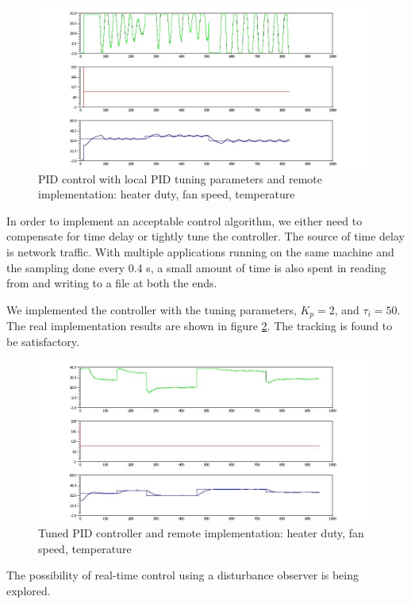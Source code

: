 \begin{figure}
\hspace{-0.2in}
\includegraphics[width=1.2\linewidth]{figures/pidc_intra_osc}
\caption{PID control with local PID tuning parameters and remote
  implementation: heater duty, fan speed, temperature}
\label{fig:pidosc}
\end{figure}

In order to implement an acceptable control algorithm, we either need to compensate for time delay or tightly tune the controller.  The source of time delay is network traffic.  With multiple applications running on the same machine and the sampling done every 0.4 s, a small amount of time is also spent in reading from and writing to a file at both the ends.

We implemented the controller with the tuning parameters, $K_p = 2$, and $\tau_i = 50$.  The real implementation results are shown in figure \ref{fig:pidctun}.  The tracking is found to be satisfactory.

\begin{figure}
\hspace{-0.2in}
\includegraphics[width=1.2\linewidth]{figures/pidc_intra}
\caption{Tuned PID controller and remote implementation: heater duty,
  fan speed, temperature}
\label{fig:pidctun}
\end{figure}

The possibility of real-time control using a disturbance observer
\cite{kempf96,jones07} is being explored. 
